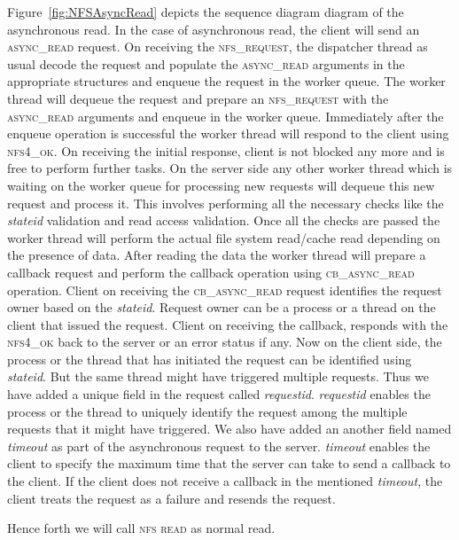 Figure~\ref{fig:NFSAsyncRead} depicts the sequence diagram diagram of the asynchronous read. 
In the case of asynchronous read, the client will send an \textsc{async\_read} request. On receiving the \textsc{nfs\_request}, the dispatcher thread as usual decode the request and populate the \textsc{async\_read} arguments in the appropriate structures and enqueue the request in the worker queue. The worker thread will dequeue the request and prepare an \textsc{nfs\_request} with the \textsc{async\_read} arguments and enqueue in the worker queue. Immediately after the enqueue operation is successful the worker thread will respond to the client using \textsc{nfs4\_ok}. On receiving the initial response, client is not blocked any more and is free to perform further tasks. On the server side any other worker thread which is waiting on the worker queue for processing new requests will dequeue this new request and process it. This involves performing all the necessary checks like the \textit{stateid} validation and read access validation. Once all the checks are passed the worker thread will perform the actual file system read/cache read depending on the presence of data. After reading the data the worker thread will prepare a callback request and perform the callback operation using \textsc{cb\_async\_read} operation. Client on receiving the \textsc{cb\_async\_read} request identifies the request owner based on the \textit{stateid}. Request owner can  be a process or a thread on the client that issued the request. Client on receiving the callback, responds with the \textsc{nfs4\_ok} back to the server or an error status if any. Now on the client side, the process or the thread that has initiated the request can be identified using \textit{stateid}. But the same thread might have triggered multiple requests. Thus we have added a unique field in the request called \textit{requestid}.  \textit{requestid} enables the process or the thread to uniquely identify the request among the multiple requests that it might have triggered. We also have added an another field named  \textit{timeout} as part of  the asynchronous request to the server. \textit{timeout} enables the client to specify the maximum time that the server can take to send a callback to the client. If the client does not receive a callback in the mentioned  \textit{timeout}, the client treats the request as a failure and resends the request.

Hence forth we will call \textsc{nfs read} as normal read.





